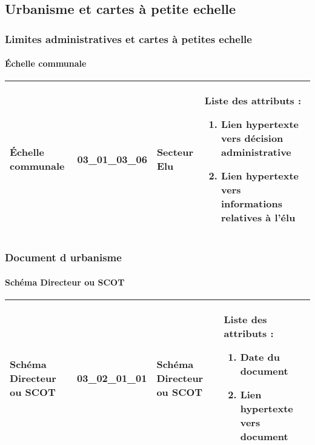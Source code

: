 \documentclass[12pt,titlepage]{book}
\begin{document}
\subsection{Urbanisme et cartes à petite echelle}
\subsubsection{\large Limites administratives et cartes à petites echelle}
\paragraph{Échelle communale}
\noindent
\vspace{\baselineskip}

\renewcommand{\arraystretch}{1.2}
\begin{supertabular}{|p{10cm}|c|p{13cm}|p{12cm}|}
 Échelle communale & 03\_01\_03\_06 & Secteur Elu & Liste des attributs :
\begin{enumerate}
  \item Lien hypertexte vers décision administrative  \item Lien hypertexte vers informations relatives à l'élu\end{enumerate}
\\
\hline
\end{supertabular}
\begin{figure}[h!]
  \hfill         %
\end{figure}

\subsubsection{\large Document d urbanisme}
\paragraph{Schéma Directeur ou SCOT}
\noindent
\vspace{\baselineskip}

\renewcommand{\arraystretch}{1.2}
\begin{supertabular}{|p{10cm}|c|p{13cm}|p{12cm}|}
 Schéma Directeur ou SCOT & 03\_02\_01\_01 & Schéma Directeur ou SCOT & Liste des attributs :
\begin{enumerate}
  \item Date du document  \item Lien hypertexte vers document\end{enumerate}
\\
\hline
\end{supertabular}
\begin{figure}[h!]
  \hfill         %
\end{figure}
\end{document}
